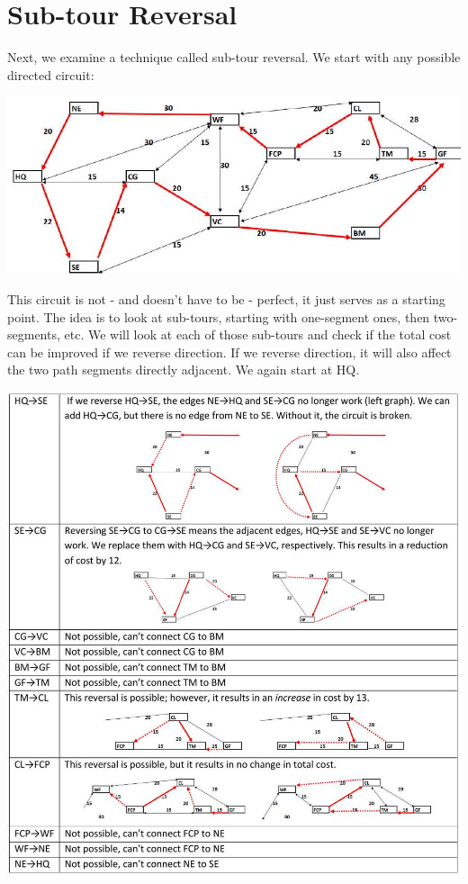 \documentclass[10pt]{article}
\begin{document}
\section{Sub-tour Reversal}
Next, we examine a technique called sub-tour reversal. We start with any possible directed circuit:

\includegraphics[max width=\textwidth]{2022_07_05_5945264bba2a5f6ba667g-55(2)}

This circuit is not - and doesn't have to be - perfect, it just serves as a starting point. The idea is to look at sub-tours, starting with one-segment ones, then two-segments, etc. We will look at each of those sub-tours and check if the total cost can be improved if we reverse direction. If we reverse direction, it will also affect the two path segments directly adjacent. We again start at HQ.

\includegraphics[max width=\textwidth]{2022_07_05_5945264bba2a5f6ba667g-56}
\end{document}
